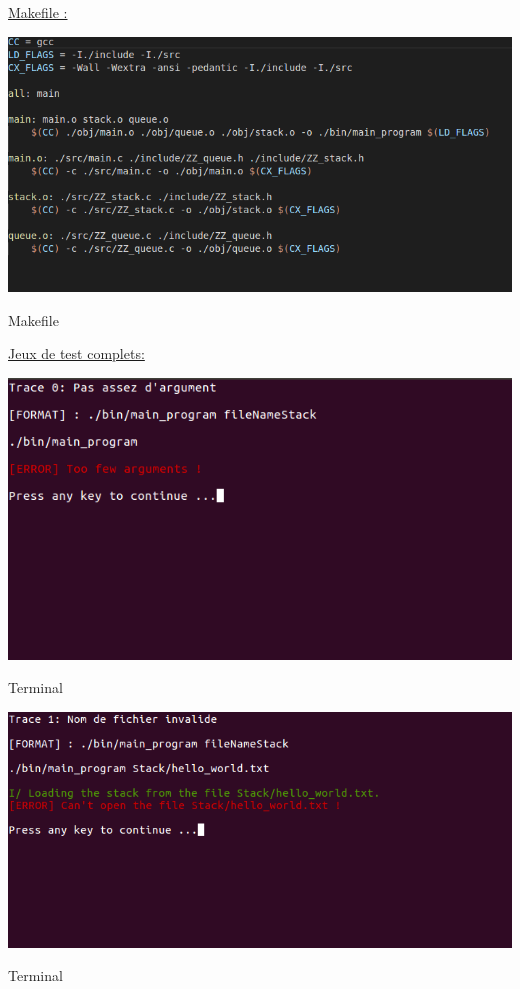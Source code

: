 \documentclass[a4paper]{article}
\begin{document}
\underline{Makefile :}
\begin{center}
\includegraphics[scale=0.39]{makefile.png}

Makefile
\end{center}

\underline{Jeux de test complets:}
\begin{center}
\includegraphics[scale=0.4]{trace0.png}

Terminal 
\end{center}

\begin{center}
\includegraphics[scale=0.4]{trace1.png}

Terminal
\end{center}
\end{document}
